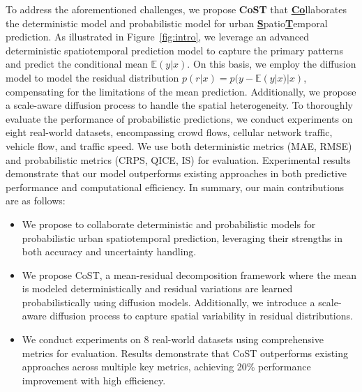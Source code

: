 To address the aforementioned challenges, we propose \textbf{CoST} that \underline{\textbf{Co}}llaborates the deterministic model and probabilistic model for urban \underline{\textbf{S}}patio\underline{\textbf{T}}emporal prediction. As illustrated in Figure~\ref{fig:intro}, we leverage an advanced deterministic spatiotemporal prediction model to capture the primary patterns and predict the conditional mean \( \mathbb{E}(y|x) \). On this basis, we employ the diffusion model to model the residual distribution \( p(r|x) = p(y - \mathbb{E}(y|x)|x) \), compensating for the limitations of the mean prediction. Additionally, we propose a scale-aware diffusion process to handle the spatial heterogeneity. To thoroughly evaluate the performance of probabilistic predictions, we conduct experiments on eight real-world datasets, encompassing crowd flows, cellular network traffic, vehicle flow, and traffic speed. We use both deterministic metrics (MAE, RMSE) and probabilistic metrics (CRPS, QICE, IS) for evaluation.
Experimental results demonstrate that our model outperforms existing approaches in both predictive performance and computational efficiency.
In summary, our main contributions are as follows:  
\begin{itemize}[leftmargin=*] 
    \item We propose to collaborate deterministic and probabilistic models for  probabilistic urban spatiotemporal prediction, leveraging their strengths in both accuracy and uncertainty handling.
    \item We propose CoST, a mean-residual decomposition framework where the mean is modeled deterministically and residual variations are learned probabilistically using diffusion models. Additionally, we introduce a scale-aware diffusion process to capture spatial variability in residual distributions.
    \item We conduct experiments on 8 real-world datasets using comprehensive metrics for evaluation. Results demonstrate that CoST outperforms existing approaches across multiple key metrics, achieving  20\% performance improvement with high efficiency.
    
\end{itemize}
 

